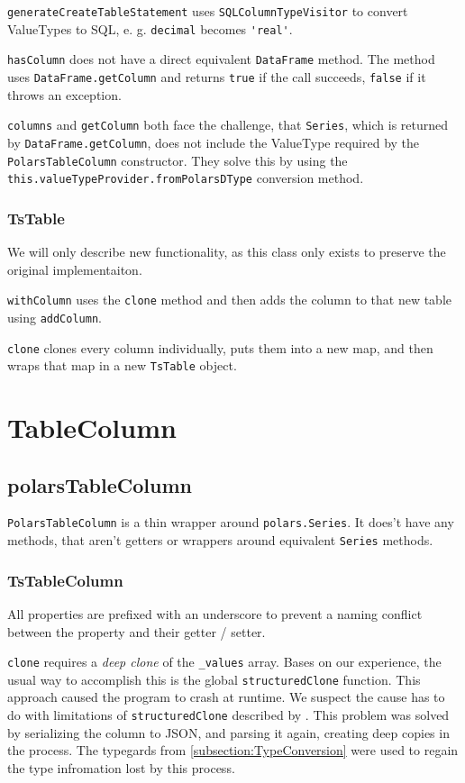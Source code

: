 \Verb|generateCreateTableStatement| uses \Verb|SQLColumnTypeVisitor| to convert ValueTypes to \ac{SQL}, e. g. \Verb|decimal| becomes \Verb|'real'|.

\Verb|hasColumn| does not have a direct equivalent \Verb|DataFrame| method.
The method uses \Verb|DataFrame.getColumn| and returns \Verb|true| if the call succeeds, \Verb|false| if it throws an exception.

\Verb|columns| and \Verb|getColumn| both face the challenge, that \Verb|Series|, which is returned by \Verb|DataFrame.getColumn|, does not include the ValueType required by the \Verb|PolarsTableColumn| constructor.
They solve this by using the \Verb|this.valueTypeProvider.fromPolarsDType| conversion method.

\subsubsection{TsTable}
We will only describe new functionality, as this class only exists to preserve the original implementaiton.

\Verb|withColumn| uses the \Verb|clone| method and then adds the column to that new table using \Verb|addColumn|.

\Verb|clone| clones every column individually, puts them into a new map, and then wraps that map in a new \Verb|TsTable| object.

\section{TableColumn}
\subsection{polarsTableColumn}
\Verb|PolarsTableColumn| is a thin wrapper around \Verb|polars.Series|.
It does't have any methods, that aren't getters or wrappers around equivalent \Verb|Series| methods.

\subsubsection{TsTableColumn}
All properties are prefixed with an underscore to prevent a naming conflict between the property and their getter / setter.

\Verb|clone| requires a \emph{deep clone} of the \Verb|_values| array.
Bases on our experience, the usual way to accomplish this is the global \Verb|structuredClone| function.
This approach caused the program to crash at runtime.
We suspect the cause has to do with limitations of \Verb|structuredClone| described by \textcite{js:docs:structuredClone}.
This problem was solved by serializing the column to \ac{JSON}, and parsing it again, creating deep copies in the process.
The typegards from \ref{subsection:TypeConversion} were used to regain the type infromation lost by this process.

